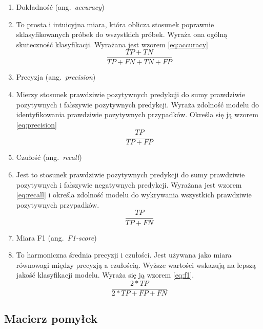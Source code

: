 \begin{enumerate}[label={\alph*)}]
	\item Dokładność (ang.~\emph{accuracy})
    \item [] To prosta i intuicyjna miara, która oblicza stosunek poprawnie sklasyfikowanych próbek do wszystkich próbek.
    Wyraża ona ogólną skuteczność klasyfikacji.
    Wyrażana jest wzorem \ref{eq:accuracy}
    \begin{equation}
        \frac{TP + TN}{TP + FN + TN + FP}\label{eq:accuracy}
    \end{equation}
    \item Precyzja (ang.~\emph{precision})
    \item [] Mierzy stosunek prawdziwie pozytywnych predykcji do sumy prawdziwie pozytywnych i  fałszywie pozytywnych predykcji.
Wyraża zdolność modelu do identyfikowania prawdziwie pozytywnych przypadków.
Określa się ją wzorem \ref{eq:precision}
      \begin{equation}
        \frac{TP}{TP + FP}\label{eq:precision}
    \end{equation}
    \item Czułość (ang.~\emph{recall})
    \item [] Jest to stosunek prawdziwie pozytywnych predykcji do sumy prawdziwie pozytywnych i fałszywie negatywnych predykcji. Wyrażana jest wzorem \ref{eq:recall} i określa zdolność modelu do wykrywania wszystkich prawdziwie pozytywnych przypadków.
    \begin{equation}
        \frac{TP}{TP + FN}\label{eq:recall}
    \end{equation}
    \item Miara F1 (ang.~\emph{F1-score})
    \item [] To harmoniczna średnia precyzji i czułości. Jest używana jako miara równowagi między precyzją a czułością. Wyższe wartości wskazują na lepszą jakość klasyfikacji modelu. Wyraża się ją wzorem \ref{eq:f1}.
  \begin{equation}
        \frac{2 * TP}{2 * TP + FP + FN}\label{eq:f1}
    \end{equation}
\end{enumerate}


\subsection{Macierz pomyłek}
\label{subsec:macierz-pomylek}

